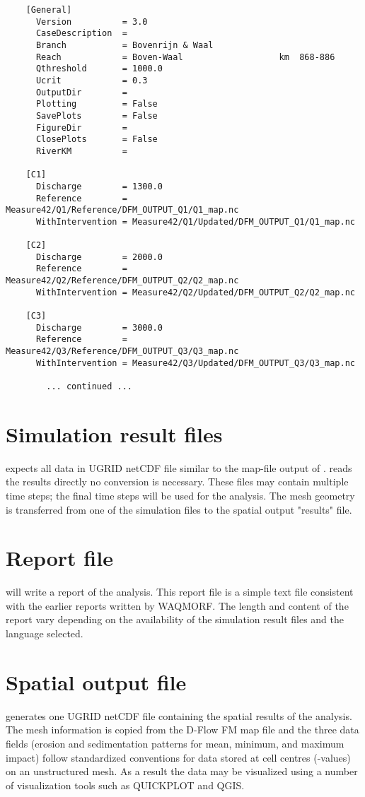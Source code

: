 \begin{Verbatim}
    [General]
      Version          = 3.0
      CaseDescription  = 
      Branch           = Bovenrijn & Waal
      Reach            = Boven-Waal                   km  868-886
      Qthreshold       = 1000.0
      Ucrit            = 0.3
      OutputDir        = 
      Plotting         = False
      SavePlots        = False
      FigureDir        = 
      ClosePlots       = False
      RiverKM          = 
    
    [C1]
      Discharge        = 1300.0
      Reference        = Measure42/Q1/Reference/DFM_OUTPUT_Q1/Q1_map.nc
      WithIntervention = Measure42/Q1/Updated/DFM_OUTPUT_Q1/Q1_map.nc
    
    [C2]
      Discharge        = 2000.0
      Reference        = Measure42/Q2/Reference/DFM_OUTPUT_Q2/Q2_map.nc
      WithIntervention = Measure42/Q2/Updated/DFM_OUTPUT_Q2/Q2_map.nc
    
    [C3]
      Discharge        = 3000.0
      Reference        = Measure42/Q3/Reference/DFM_OUTPUT_Q3/Q3_map.nc
      WithIntervention = Measure42/Q3/Updated/DFM_OUTPUT_Q3/Q3_map.nc

        ... continued ...
\end{Verbatim}

\section{Simulation result files}

\dfastmi expects all data in UGRID netCDF file similar to the map-file output of \dflowfm.
\dfastmi reads the results directly no conversion is necessary.
These files may contain multiple time steps; the final time steps will be used for the analysis.
The mesh geometry is transferred from one of the simulation files to the \dfastmi spatial output "results" file.

\section{Report file}

\dfastmi will write a report of the analysis.
This report file is a simple text file consistent with the earlier reports written by WAQMORF.
The length and content of the report vary depending on the availability of the simulation result files and the language selected.


\section{Spatial output file}

\dfastmi generates one UGRID netCDF file containing the spatial results of the analysis.
The mesh information is copied from the D-Flow FM map file and the three data fields (erosion and sedimentation patterns for mean, minimum, and maximum impact) follow standardized conventions for data stored at cell centres (-values) on an unstructured mesh.
As a result the data may be visualized using a number of visualization tools such as QUICKPLOT and QGIS.
